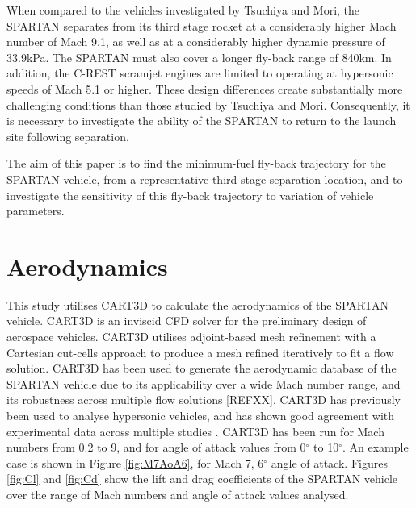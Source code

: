\documentclass[conf]{new-aiaa}
\begin{document}
When compared to the vehicles investigated by Tsuchiya and Mori\cite{Tsuchiya2005}, the SPARTAN separates from its third stage rocket at a considerably higher Mach number of Mach 9.1, as well as at a considerably higher dynamic pressure of 33.9kPa. The SPARTAN must also cover a longer fly-back range of 840km. In addition, the C-REST scramjet engines are limited to operating at hypersonic speeds of Mach 5.1 or higher. These design differences create substantially more challenging conditions than those studied by Tsuchiya and Mori. Consequently, it is necessary to investigate the ability of the SPARTAN to return to the launch site following separation. 

The aim of this paper is to find the minimum-fuel fly-back trajectory for the SPARTAN vehicle, from a representative third stage separation location, and to investigate the sensitivity of this fly-back trajectory to variation of vehicle parameters. 











\section{Aerodynamics}\label{sec:aero}
 This study utilises CART3D to calculate the aerodynamics of the SPARTAN vehicle\cite{CART3D}. CART3D is an inviscid CFD solver for the preliminary design of aerospace vehicles. CART3D utilises adjoint-based mesh refinement with a Cartesian cut-cells approach to produce a mesh refined iteratively to fit a flow solution\cite{Aftosmis1997}. CART3D has been used to generate the aerodynamic database of the SPARTAN vehicle due to its applicability over a wide Mach number range, and its robustness across multiple flow solutions [REFXX]. CART3D has previously been used to analyse hypersonic vehicles, and has shown good agreement with experimental data across multiple studies \cite{Sagerman2017,Aftosmis2011}. CART3D has been run for Mach numbers from 0.2 to 9, and for angle of attack values from 0$^\circ$ to 10$^\circ$. An example case is shown in Figure \ref{fig:M7AoA6}, for Mach 7, 6$^\circ$ angle of attack. Figures \ref{fig:Cl} and \ref{fig:Cd} show the lift and drag coefficients of the SPARTAN vehicle over the range of Mach numbers and angle of attack values analysed. 
 
\end{document}
